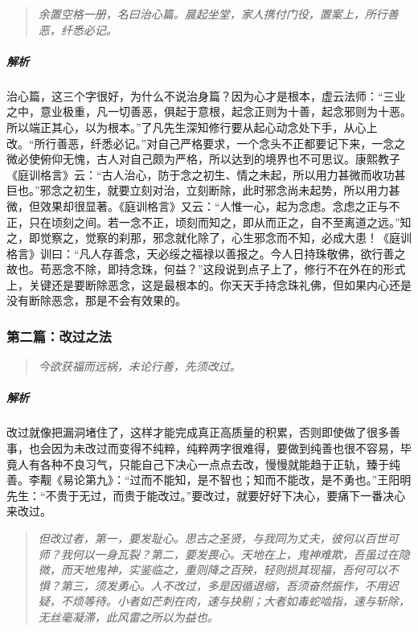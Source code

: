 \begin{quote}\it
    余置空格一册，名曰治心篇。晨起坐堂，家人携付门役，置案上，所行善恶，纤悉必记。
\end{quote}

\subparagraph{解析} 治心篇，这三个字很好，为什么不说治身篇？因为心才是根本，虚云法师：“三业之中，意业极重，凡一切善恶，俱起于意根，起念正则为十善，起念邪则为十恶。所以端正其心，以为根本。”了凡先生深知修行要从起心动念处下手，从心上改。“所行善恶，纤悉必记。”对自己严格要求，一个念头不正都要记下来，一念之微必使俯仰无愧，古人对自己颇为严格，所以达到的境界也不可思议。康熙教子《庭训格言》云：“古人治心，防于念之初生、情之未起，所以用力甚微而收功甚巨也。”邪念之初生，就要立刻对治，立刻断除，此时邪念尚未起势，所以用力甚微，但效果却很显著。《庭训格言》又云：“人惟一心，起为念虑。念虑之正与不正，只在顷刻之间。若一念不正，顷刻而知之，即从而正之，自不至离道之远。”知之，即觉察之，觉察的刹那，邪念就化除了，心生邪念而不知，必成大患！《庭训格言》训曰：“凡人存善念，天必绥之福禄以善报之。今人日持珠敬佛，欲行善之故也。苟恶念不除，即持念珠，何益？”这段说到点子上了，修行不在外在的形式上，关键还是要断除恶念，这是最根本的。你天天手持念珠礼佛，但如果内心还是没有断除恶念，那是不会有效果的。

\subsubsection{第二篇：改过之法}

\begin{quote}\it
    今欲获福而远祸，未论行善，先须改过。
\end{quote}

\subparagraph{解析} 改过就像把漏洞堵住了，这样才能完成真正高质量的积累，否则即使做了很多善事，也会因为未改过而变得不纯粹，纯粹两字很难得，要做到纯善也很不容易，毕竟人有各种不良习气，只能自己下决心一点点去改，慢慢就能趋于正轨，臻于纯善。李觏《易论第九》：“过而不能知，是不智也；知而不能改，是不勇也。”王阳明先生：“不贵于无过，而贵于能改过。”要改过，就要好好下决心，要痛下一番决心来改过。

\begin{quote}\it
    但改过者，第一，要发耻心。思古之圣贤，与我同为丈夫，彼何以百世可师？我何以一身瓦裂？第二，要发畏心。天地在上，鬼神难欺，吾虽过在隐微，而天地鬼神，实鉴临之，重则降之百殃，轻则损其现福，吾何可以不惧？第三，须发勇心。人不改过，多是因循退缩，吾须奋然振作，不用迟疑，不烦等待。小者如芒刺在肉，速与抉剔；大者如毒蛇啮指，速与斩除，无丝毫凝滞，此风雷之所以为益也。
\end{quote}

